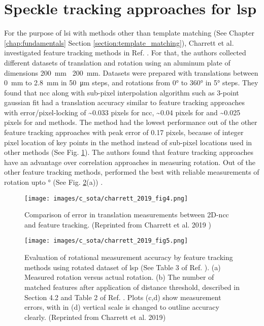 \clearpage
\section{Speckle tracking approaches for \gls{lsp}}\label{section:speckle_tracking}

For the purpose of \gls{lsi} with methods other than template matching (See Chapter \ref{chap:fundamentals} Section \ref{section:template_matching}), Charrett et al. investigated feature tracking methods in Ref. \cite{charrett_2019}. For that, the authors collected different datasets of translation and rotation using an aluminum plate of dimensions \SI{200}{\milli\meter} \times\ \SI{200}{\milli\meter}. Datasets were prepared with translations between \SI{0}{\milli\meter} to \SI{2.8}{\milli\meter} in \SI{50}{\micro\meter} steps, and rotations from 0° to 360° in 5° steps. They found that \gls{ncc} along with sub-pixel interpolation algorithm such as 3-point gaussian fit \cite{raffel} had a translation accuracy similar to feature tracking approaches with error/pixel-locking of \sim0.033 pixels for \gls{ncc}, \sim0.04 pixels for \cite{brisk_feature} and \sim0.025 pixels for \cite{surf_feature} and \cite{surf_feature} methods. The \cite{orb_feature} method had the lowest performance out of the other feature tracking approaches with peak error of 0.17 pixels, because of integer pixel location of key points in the method instead of sub-pixel locations used in other methods (See Fig. \ref{fig:charrett_2019_fig4}). The authors found that feature tracking approaches have an advantage over correlation approaches in measuring rotation. Out of the other feature tracking methods,  performed the best with reliable measurements of rotation upto ° (See Fig. \ref{fig:charrett_2019_fig5}(a)) \cite{charrett_2019}.


\begin{figure}[h]
    \centering
    \texttt{[image: images/c\_sota/charrett\_2019\_fig4.png]}
    \caption{Comparison of error in translation measurements between 2D-\gls{ncc} and feature tracking. (Reprinted from Charrett et al. 2019 \cite{charrett_2019})}
    \label{fig:charrett_2019_fig4}
\end{figure} 

\begin{figure}[h]
    \centering
    \texttt{[image: images/c\_sota/charrett\_2019\_fig5.png]}
    \caption{Evaluation of rotational measurement accuracy by feature tracking methods using rotated dataset of \gls{lsp} (See Table 3 of Ref. \cite{charrett_2019}). (a) Measured rotation versus actual rotation. (b) The number of matched features after application of distance threshold, described in Section 4.2 and Table 2 of Ref. \cite{charrett_2019}. Plots (c,d) show measurement errors, with in (d) vertical scale is changed to outline accuracy clearly. (Reprinted from Charrett et al. 2019\cite{charrett_2019})}
    \label{fig:charrett_2019_fig5}
\end{figure} 

